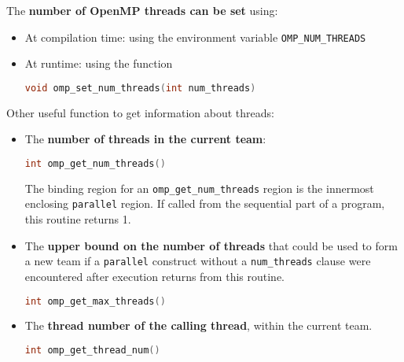 \noindent
The \textbf{number of OpenMP threads can be set} using:
\begin{itemize}
    \item At compilation time: using the environment variable \texttt{OMP\_NUM\_THREADS}
    \item At runtime: using the function
    \begin{openmpbox}
        \begin{lstlisting}[language=C++]
void omp_set_num_threads(int num_threads)\end{lstlisting}
    \end{openmpbox}
\end{itemize}
Other useful function to get information about threads:
\begin{itemize}
    \item The \textbf{number of threads in the current team}:
    \begin{openmpbox}
        \begin{lstlisting}[language=C++]
int omp_get_num_threads()\end{lstlisting}
    \end{openmpbox}
    The binding region for an \texttt{omp\_get\_num\_threads} region is the innermost enclosing \texttt{parallel} region. If called from the sequential part of a program, this routine returns 1.

    \newpage

    \item The \textbf{upper bound on the number of threads} that could be used to form a new team if a \texttt{parallel} construct without a \texttt{num\_threads} clause were encountered after execution returns from this routine.
    \begin{openmpbox}
        \begin{lstlisting}[language=C++]
int omp_get_max_threads()\end{lstlisting}
    \end{openmpbox}

    \item The \textbf{thread number of the calling thread}, within the current team.
    \begin{openmpbox}
        \begin{lstlisting}[language=C++]
int omp_get_thread_num()\end{lstlisting}
    \end{openmpbox}
    

\end{itemize}
